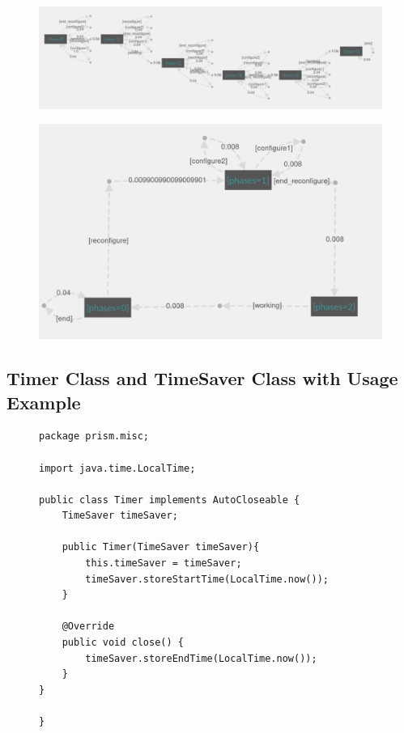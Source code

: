 \documentclass[preview]{standalone}
\begin{document}
\begin{figure}[!htb]
	\includegraphics[width=\textwidth]{./06/images/06_03_time.png}
\end{figure}

\begin{figure}[!htb]
	\includegraphics[width=\textwidth]{./06/images/06_03_phases.png}
\end{figure}

\pagebreak

\subsection[Classes Time Measuring and Usage Example]{Timer Class and TimeSaver Class with Usage Example}\label{apx:timerandexmp}
\begin{figure}[!htb]
\begin{lstlisting}[style=javaStyle, caption={Timer.java}]
package prism.misc;

import java.time.LocalTime;

public class Timer implements AutoCloseable {
	TimeSaver timeSaver;
	
	public Timer(TimeSaver timeSaver){
		this.timeSaver = timeSaver;
		timeSaver.storeStartTime(LocalTime.now());
	}
	
	@Override
	public void close() {
		timeSaver.storeEndTime(LocalTime.now());
	}
}

}
\end{lstlisting}
\end{figure}
\end{document}
